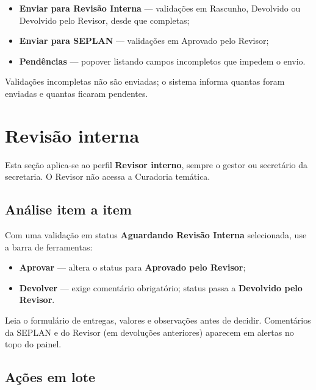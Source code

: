 \documentclass[11pt,a4paper]{article}
\begin{document}
\begin{itemize}
  \item \textbf{Enviar para Revisão Interna} — validações em Rascunho, Devolvido ou Devolvido pelo Revisor, desde que completas;
  \item \textbf{Enviar para SEPLAN} — validações em Aprovado pelo Revisor;
  \item \textbf{Pendências} — popover listando campos incompletos que impedem o envio.
\end{itemize}

Validações incompletas não são enviadas; o sistema informa quantas foram enviadas e quantas ficaram pendentes.

\section{Revisão interna}

\begin{boxrevisor}
Esta seção aplica-se ao perfil \textbf{Revisor interno}, sempre o gestor ou secretário da secretaria. O Revisor não acessa a Curadoria temática.
\end{boxrevisor}

\subsection{Análise item a item}

Com uma validação em status \textbf{Aguardando Revisão Interna} selecionada, use a barra de ferramentas:

\begin{itemize}
  \item \textbf{Aprovar} — altera o status para \textbf{Aprovado pelo Revisor};
  \item \textbf{Devolver} — exige comentário obrigatório; status passa a \textbf{Devolvido pelo Revisor}.
\end{itemize}

Leia o formulário de entregas, valores e observações antes de decidir. Comentários da SEPLAN e do Revisor (em devoluções anteriores) aparecem em alertas no topo do painel.

\subsection{Ações em lote}
\end{document}
